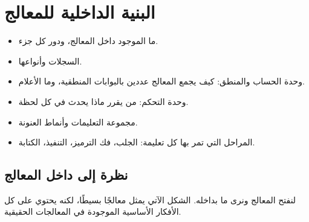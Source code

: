 \chapter{البنية الداخلية للمعالج}

\begin{khulasa}
\begin{itemize}
    \item ما الموجود داخل المعالج، ودور كل جزء.
    \item السجلات وأنواعها.
    \item وحدة الحساب والمنطق: كيف يجمع المعالج عددين بالبوابات المنطقية، وما الأعلام.
    \item وحدة التحكم: من يقرر ماذا يحدث في كل لحظة.
    \item مجموعة التعليمات وأنماط العنونة.
    \item المراحل التي تمر بها كل تعليمة: الجلب، فك الترميز، التنفيذ، الكتابة.
\end{itemize}
\end{khulasa}

\section{نظرة إلى داخل المعالج}

لنفتح المعالج ونرى ما بداخله. الشكل الآتي يمثل معالجًا بسيطًا، لكنه يحتوي على كل الأفكار
الأساسية الموجودة في المعالجات الحقيقية.

